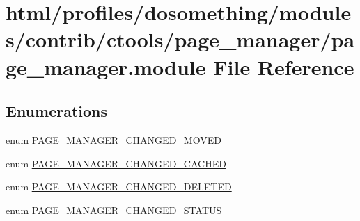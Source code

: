 \hypertarget{page__manager_8module}{
\section{html/profiles/dosomething/modules/contrib/ctools/page\_\-manager/page\_\-manager.module File Reference}
\label{page__manager_8module}
}
\subsection*{Enumerations}
\begin{DoxyCompactItemize}
\item 
enum \hyperlink{page__manager_8module_a67a367c02b464d01501dd7977ff98d57}{PAGE\_\-MANAGER\_\-CHANGED\_\-MOVED} 
\item 
enum \hyperlink{page__manager_8module_a1725bd9d5ce31fc2c3c71b9374cee612}{PAGE\_\-MANAGER\_\-CHANGED\_\-CACHED} 
\item 
enum \hyperlink{page__manager_8module_a8b50720174159dd5fe0027078dc67c1b}{PAGE\_\-MANAGER\_\-CHANGED\_\-DELETED} 
\item 
enum \hyperlink{page__manager_8module_a37b3f0cf36e7fd00e7868c8eb5bf449d}{PAGE\_\-MANAGER\_\-CHANGED\_\-STATUS} 
\end{DoxyCompactItemize}

